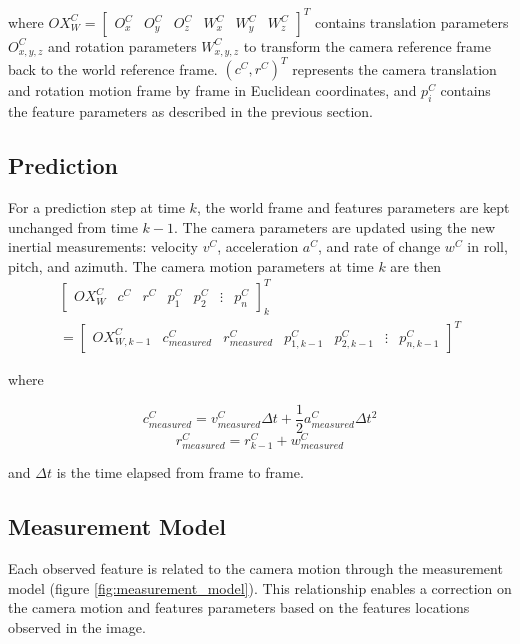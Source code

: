 \noindent where $OX_{W}^{C}= \begin{bmatrix}O_{x}^{C} & O_{y}^{C} &
  O_{z}^{C} & W_{x}^{C} & W_{y}^{C} & W_{z}^{C} \end{bmatrix}^{T}$
contains translation parameters $O_{x,y,z}^{C}$ and rotation
parameters $W_{x,y,z}^{C}$ to transform the camera reference frame
back to the world reference frame. $\left(c^{C},r^{C}\right)^{T}$
represents the camera translation and rotation motion frame by frame
in Euclidean coordinates, and $p_{i}^{C}$ contains the feature
parameters as described in the previous section.

\subsection{Prediction}

For a prediction step at time $k$, the world frame and features
parameters are kept unchanged from time $k-1$. The camera parameters
are updated using the new inertial measurements: velocity $v^{C}$,
acceleration $a^{C}$, and rate of change $w^{C}$ in roll, pitch, and
azimuth. The camera motion parameters at time $k$ are then
\begin{multline}
\begin{bmatrix}
OX_{W}^{C} & c^{C} & r^{C} & p_{1}^{C}& p_{2}^{C} & \vdots & p_n^C
\end{bmatrix}_{k}^T \\
=\begin{bmatrix}
OX_{W,k-1}^{C} & c_{measured}^{C} & r_{measured}^{C} & p_{1,k-1}^{C} &
p_{2,k-1}^{C} & \vdots & p_{n,k-1}^C
\end{bmatrix}^T
\end{multline}

\noindent where 

$$c_{measured}^{C}=v_{measured}^{C}\Delta t+ \frac{1}{2}a_{measured}^{C}\Delta t^{2}$$
$$r_{measured}^{C}=r_{k-1}^{C}+ w_{measured}^{C}$$

\noindent and $\Delta t$ is the time elapsed from frame to frame. 

\subsection{Measurement Model}

Each observed feature is related to the camera motion through the
measurement model (figure \ref{fig:measurement_model}). This
relationship enables a correction on the camera motion and features
parameters based on the features locations observed in the image.

